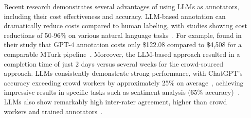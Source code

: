 Recent research demonstrates several advantages of using LLMs as annotators, including their cost effectiveness and accuracy.
LLM-based annotation can dramatically reduce costs compared to human labeling, with studies showing cost reductions of 50-96\% on various natural language tasks~\cite{DBLP:conf/emnlp/WangLXZZ21}.
For example, \citeauthor{DBLP:conf/chi/HeHDRH24} found in their study that GPT-4 annotation costs only \$122.08 compared to \$4,508 for a comparable MTurk pipeline~\cite{DBLP:conf/chi/HeHDRH24}.
Moreover, the LLM-based approach resulted in a completion time of just 2 days versus several weeks for the crowd-sourced approach.
LLMs consistently demonstrate strong performance, with ChatGPT's accuracy exceeding crowd workers by approximately 25\% on average~\cite{DBLP:journals/corr/abs-2303-15056}, achieving impressive results in specific tasks such as sentiment analysis (65\% accuracy)~\cite{DBLP:journals/corr/abs-2304-10145}.
LLMs also show remarkably high inter-rater agreement, higher than crowd workers and trained annotators~\cite{DBLP:journals/corr/abs-2303-15056}.

